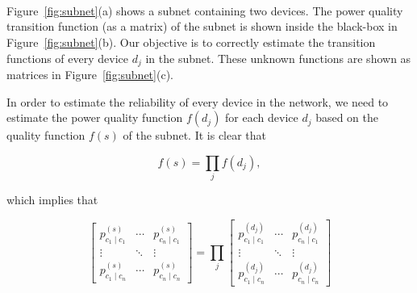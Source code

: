 \begin{figure*}[!p]
\centering
	\\ \vspace{1cm}
	\\ \vspace{1cm}
	 \\\vspace{0.5cm}
\caption{Subnet power transition matrix as a product of power transition matrices of individual devices.} \label{fig:subnet}
\end{figure*}

Figure~\ref{fig:subnet}(a) shows a subnet containing two devices. The power quality transition function (as a matrix) of the subnet is shown inside the black-box in Figure~\ref{fig:subnet}(b). Our objective is to correctly estimate the transition functions of every device $d_j$ in the subnet. These unknown functions are shown as matrices in Figure~\ref{fig:subnet}(c).

In order to estimate the reliability of every device in the network, we need to estimate the power quality function $f(d_j)$ for each device $d_j$ based on the quality function $f(s)$ of the subnet. It is clear that

\begin{equation}
f(s) = \prod_{j} f(d_j),
\end{equation}

\noindent
which implies that

\begin{equation}
\left[\begin{array}{ccc}
p_{c_1  \mid c_1}^{(s)} & \cdots & p_{c_n  \mid c_1}^{(s)}\\
\vdots & \ddots & \vdots\\
p_{c_1  \mid c_n}^{(s)} & \cdots & p_{c_n  \mid c_n}^{(s)}
\end{array}\right]= \prod_j { \left[\begin{array}{ccc}
p_{c_1 \mid c_1}^{(d_j)} & \cdots & p_{c_n  \mid c_1}^{(d_j)}\\
\vdots & \ddots & \vdots\\
p_{c_1 \mid c_n}^{(d_j)} & \cdots & p_{c_n \mid c_n}^{(d_j)}\end{array}\right]}
\label{eqn:product}
\end{equation}


